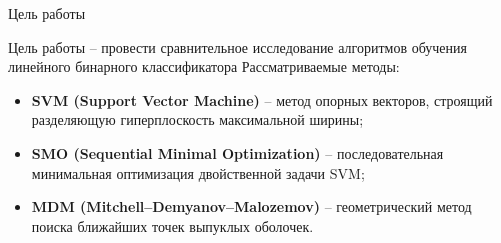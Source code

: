 \SPBGContentSlide
  {Цель работы}
  {%
    \Body
    Цель работы -- провести сравнительное исследование алгоритмов
    обучения линейного бинарного классификатора
      \vspace{.24cm}
    Рассматриваемые методы:
    \begin{itemize}
      \setlength{\itemsep}{.18cm}
      \item \textbf{SVM (Support Vector Machine)} -- метод опорных
      векторов, строящий разделяющую гиперплоскость максимальной ширины;
      \item \textbf{SMO (Sequential Minimal Optimization)} --
      последовательная минимальная оптимизация двойственной задачи SVM;
      \item \textbf{MDM (Mitchell--Demyanov--Malozemov)} --
      геометрический метод поиска ближайших точек выпуклых оболочек.
    \end{itemize}
  }

  
  

